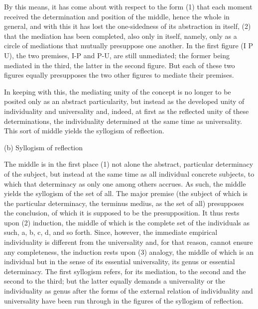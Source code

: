 By this means, it has come about with respect to the form
(1) that each moment received the determination and position of
the middle, hence the whole in general, and with this it has lost
the one-sidedness of its abstraction in itself,
(2) that the mediation has been completed, also only in itself, namely,
only as a circle of mediations that mutually presuppose one another.
In the first figure (I P U), the two premises,
I-P and P-U, are still unmediated;
the former being mediated in the third,
the latter in the second figure.
But each of these two figures equally presupposes
the two other figures to mediate their premises.

In keeping with this, the mediating unity of the concept
is no longer to be posited only as an abstract particularity,
but instead as the developed unity of individuality and universality
and, indeed, at first as the reflected unity of these determinations,
the individuality determined at the same time as universality.
This sort of middle yields the syllogism of reflection.

(b) Syllogism of reflection

The middle is in the first place (1) not alone
the abstract, particular determinacy of the subject,
but instead at the same time as all individual concrete subjects,
to which that determinacy as only one among others accrues.
As such, the middle yields the syllogism of the set of all.
The major premise (the subject of which is the particular determinacy,
the terminus medius, as the set of all)
presupposes the conclusion,
of which it is supposed to be the presupposition.
It thus rests upon (2) induction,
the middle of which is the complete set of the individuals as such,
a, b, c, d, and so forth.
Since, however, the immediate empirical individuality
is different from the universality
and, for that reason, cannot ensure any completeness,
the induction rests upon (3) analogy,
the middle of which is an individual
but in the sense of its essential universality,
its genus or essential determinacy.
The first syllogism refers, for its mediation,
to the second and the second to the third;
but the latter equally demands a universality
or the individuality as genus
after the forms of the external relation of
individuality and universality have been run through
in the figures of the syllogism of reflection.

